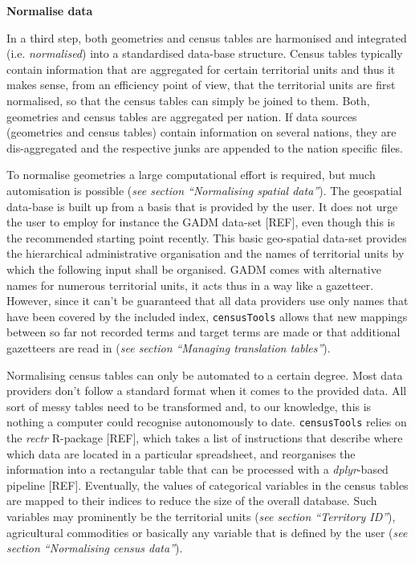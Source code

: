 \documentclass[12pt,]{article}
\begin{document}
\textbf{Normalise data}

In a third step, both geometries and census tables are harmonised and integrated (i.e. \emph{normalised}) into a standardised data-base structure.
Census tables typically contain information that are aggregated for certain territorial units and thus it makes sense, from an efficiency point of view, that the territorial units are first normalised, so that the census tables can simply be joined to them.
Both, geometries and census tables are aggregated per nation.
If data sources (geometries and census tables) contain information on several nations, they are dis-aggregated and the respective junks are appended to the nation specific files.

To normalise geometries a large computational effort is required, but much automisation is possible (\emph{see section ``Normalising spatial data''}).
The geospatial data-base is built up from a basis that is provided by the user.
It does not urge the user to employ for instance the GADM data-set {[}REF{]}, even though this is the recommended starting point recently.
This basic geo-spatial data-set provides the hierarchical administrative organisation and the names of territorial units by which the following input shall be organised.
GADM comes with alternative names for numerous territorial units, it acts thus in a way like a gazetteer.
However, since it can't be guaranteed that all data providers use only names that have been covered by the included index, \texttt{censusTools} allows that new mappings between so far not recorded terms and target terms are made or that additional gazetteers are read in (\emph{see section ``Managing translation tables''}).

Normalising census tables can only be automated to a certain degree.
Most data providers don't follow a standard format when it comes to the provided data.
All sort of messy tables need to be transformed and, to our knowledge, this is nothing a computer could recognise autonomously to date.
\texttt{censusTools} relies on the \emph{rectr} R-package {[}REF{]}, which takes a list of instructions that describe where which data are located in a particular spreadsheet, and reorganises the information into a rectangular table that can be processed with a \emph{dplyr}-based pipeline {[}REF{]}.
Eventually, the values of categorical variables in the census tables are mapped to their indices to reduce the size of the overall database.
Such variables may prominently be the territorial units (\emph{see section ``Territory ID''}), agricultural commodities or basically any variable that is defined by the user (\emph{see section ``Normalising census data''}).
\end{document}
